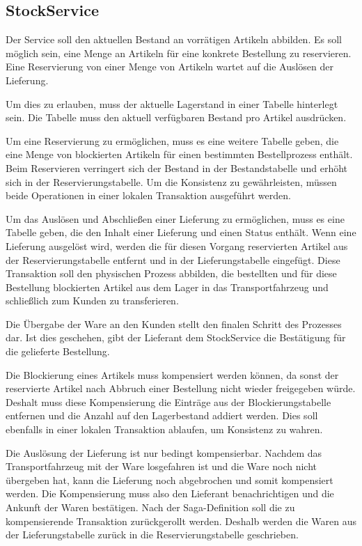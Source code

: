 \subsection{StockService}
Der Service soll den aktuellen Bestand an vorrätigen Artikeln abbilden. Es soll möglich sein, eine Menge an Artikeln für eine konkrete Bestellung zu reservieren. Eine Reservierung von einer Menge von Artikeln wartet auf die Auslösen der Lieferung.

Um dies zu erlauben, muss der aktuelle Lagerstand in einer Tabelle hinterlegt sein. Die Tabelle muss den aktuell verfügbaren Bestand pro Artikel ausdrücken. 

Um eine Reservierung zu ermöglichen, muss es eine weitere Tabelle geben, die eine Menge von blockierten Artikeln für einen bestimmten Bestellprozess enthält. Beim Reservieren verringert sich der Bestand in der Bestandstabelle und erhöht sich in der Reservierungstabelle. Um die Konsistenz zu gewährleisten, müssen beide Operationen in einer lokalen Transaktion ausgeführt werden. 

Um das Auslösen und Abschließen einer Lieferung zu ermöglichen, muss es eine Tabelle geben, die den Inhalt einer Lieferung und einen Status enthält.
Wenn eine Lieferung ausgelöst wird, werden die für diesen Vorgang reservierten Artikel aus der Reservierungstabelle entfernt und in der Lieferungstabelle eingefügt. Diese Transaktion soll den physischen Prozess abbilden, die bestellten und für diese Bestellung blockierten Artikel aus dem Lager in das Transportfahrzeug und schließlich zum Kunden zu transferieren.

Die Übergabe der Ware an den Kunden stellt den finalen Schritt des Prozesses dar. Ist dies geschehen, gibt der Lieferant dem StockService die Bestätigung für die gelieferte Bestellung.

Die Blockierung eines Artikels muss kompensiert werden können, da sonst der reservierte Artikel nach Abbruch einer Bestellung nicht wieder freigegeben würde. Deshalt muss diese Kompensierung die Einträge aus der Blockierungstabelle entfernen und die Anzahl auf den Lagerbestand addiert werden. Dies soll ebenfalls in einer lokalen Transaktion ablaufen, um Konsistenz zu wahren.

Die Auslösung der Lieferung ist nur bedingt kompensierbar. Nachdem das Transportfahrzeug mit der Ware losgefahren ist und die Ware noch nicht übergeben hat, kann die Lieferung noch abgebrochen und somit kompensiert werden. Die Kompensierung muss also den Lieferant benachrichtigen und die Ankunft der Waren bestätigen. Nach der Saga-Definition soll die zu kompensierende Transaktion zurückgerollt werden. Deshalb werden die Waren aus der Lieferungstabelle zurück in die Reservierungstabelle geschrieben. 

